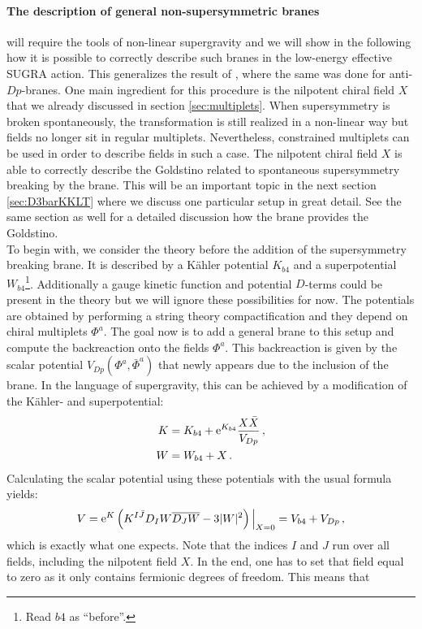 \documentclass[a4paper,12pt,twoside,openright]{report}
\newcommand{\be}{\begin{equation}}
\newcommand{\ee}{\end{equation}}
\newcommand{\bea}{\begin{equation}\begin{aligned}}
\newcommand{\eea}{\end{aligned}\end{equation}}
\def\rme{{\rm e}}
\begin{document}
\paragraph{The description of general non-supersymmetric branes} will require the tools of non-linear supergravity and we will show in the following how it is possible to correctly describe such branes in the low-energy effective SUGRA action. This generalizes the result of \cite{Kallosh:2018nrk}, where the same was done for anti-$Dp$-branes. One main ingredient for this procedure is the nilpotent chiral field $X$ that we already discussed in section \ref{sec:multiplets}. When supersymmetry is broken spontaneously, the transformation is still realized in a non-linear way but fields no longer sit in regular multiplets. Nevertheless, constrained multiplets can be used in order to describe fields in such a case. The nilpotent chiral field $X$ is able to correctly describe the Goldstino related to spontaneous supersymmetry breaking by the brane. This will be an important topic in the next section \ref{sec:D3barKKLT} where we discuss one particular setup in great detail. See the same section as well for a detailed discussion how the brane provides the Goldstino.\\
To begin with, we consider the theory before the addition of the supersymmetry breaking brane. It is described by a Kähler potential $K_{b4}$ and a superpotential $W_{b4}$\footnote{Read $b4$ as ``before''.}. Additionally a gauge kinetic function and potential $D$-terms could be present in the theory but we will ignore these possibilities for now. The potentials are obtained by performing a string theory compactification and they depend on chiral multiplets $\Phi^a$. The goal now is to add a general brane to this setup and compute the backreaction onto the fields $\Phi^a$. This backreaction is given by the scalar potential $V_{Dp}(\Phi^a,\bar{\Phi}^a)$ that newly appears due to the inclusion of the brane. In the language of supergravity, this can be achieved by a modification of the Kähler- and superpotential:
\bea
K &= K_{b4} + \rme^{K_{b4}} \frac{X\bar{X}}{V_{Dp}}\,,\\
W &= W_{b4} + X\,.
\label{eq:newsugra}
\eea
Calculating the scalar potential using these potentials with the usual formula yields:
\be 
V = \rme^K \left(K^{I\bar{J}} D_I W \overline{D_J W} - 3 |W|^2 \right)\Big|_{X=0}  = V_{b4} + V_{Dp}\,,
\ee
which is exactly what one expects. Note that the indices $I$ and $J$ run over all fields, including the nilpotent field $X$. In the end, one has to set that field equal to zero as it only contains fermionic degrees of freedom. This means that 
\end{document}
